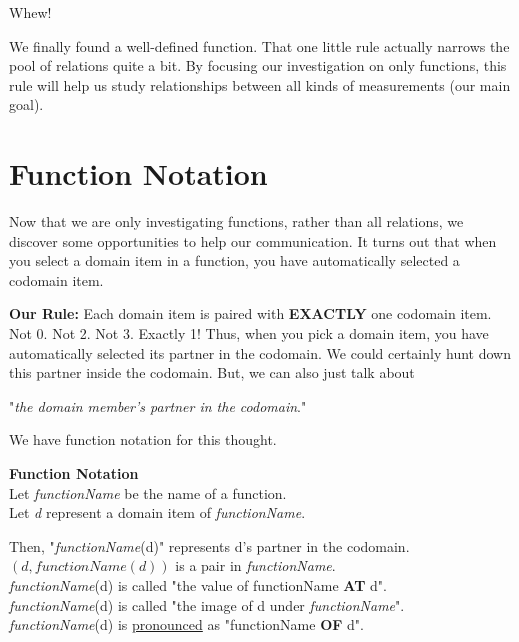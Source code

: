 \documentclass{ximera}
\begin{document}
Whew!  

We finally found a well-defined function. That one little rule actually narrows the pool of relations quite a bit.  By focusing our investigation on only functions, this rule will help us study relationships between all kinds of measurements (our main goal). \\












\section{Function Notation}

Now that we are only investigating functions, rather than all relations, we discover some opportunities to help our communication.  It turns out that when you select a domain item in a function, you have automatically selected a codomain item.

\textbf{Our Rule:} Each domain item is paired with \textbf{\textcolor{purple!85!blue}{EXACTLY}} one codomain item.  Not 0. Not 2.  Not 3.  Exactly 1!  Thus, when you pick a domain item, you have automatically selected its partner in the codomain.  We could certainly hunt down this partner inside the codomain.  But, we can also just talk about 


\begin{center}
"\textit{the domain member's partner in the codomain}."  
\end{center}



We have function notation for this thought. \\

\begin{notation} \textbf{\textcolor{green!50!black}{Function Notation}}  \\

Let \textit{functionName} be the name of a function. \\
Let \textit{d} represent a domain item of \textit{functionName}.

Then, "\textit{functionName}(d)" represents d's partner in the codomain. \\

$(d, functionName(d))$ is a pair in \textit{functionName}. \\


\textit{functionName}(d) is called "the value of functionName \textbf{\textcolor{purple!85!blue}{AT}} d". \\
\textit{functionName}(d) is called "the image of d under \textit{functionName}". \\
\textit{functionName}(d) is \underline{pronounced} as "functionName \textbf{\textcolor{purple!85!blue}{OF}} d".
\end{notation}
\end{document}
